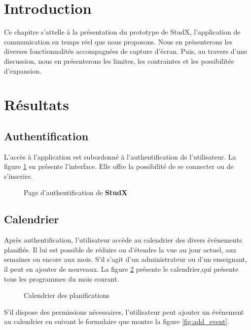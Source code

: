 \section*{Introduction}
Ce chapitre s'attelle à la présentation du prototype de StudX, l’application de communication en temps réel que nous proposons. 
Nous en présenterons les diverses fonctionnalités accompagnées de capture d'écran. 
Puis, au travers d’une discussion, nous en présenterons les limites, les contraintes et les possibilités d’expansion.

\section{Résultats}
\subsection{Authentification}
L'accès à l’application est subordonné à l'authentification de l’utilisateur. 
La figure \ref{fig:proto_auth} en présente l’interface. 
Elle offre la possibilité de se connecter ou de s'inscrire.

\begin{figure}[H]
  \centering
  \caption{Page d'authentification de \textbf{StudX}}
  \label{fig:proto_auth}
\end{figure}

\subsection{Calendrier}
Après authentification, l’utilisateur accède au calendrier des divers événements planifiés. 
Il lui est possible de réduire ou d'étendre la vue au jour actuel, aux semaines ou encore aux mois.  
S’il s’agit d’un administrateur ou d’un enseignant, il peut en ajouter de nouveaux.
La figure \ref{fig:proto_calendar_view} présente le calendrier,qui présente tous les programmes du mois courant.

\begin{figure}[H]
  \centering
  \caption{Calendrier des planifications}
  \label{fig:proto_calendar_view}
\end{figure}

S’il dispose des permissions nécessaires, 
l’utilisateur peut ajouter un événement au calendrier en suivant le formulaire que montre la figure \ref{fig:add_event}.


